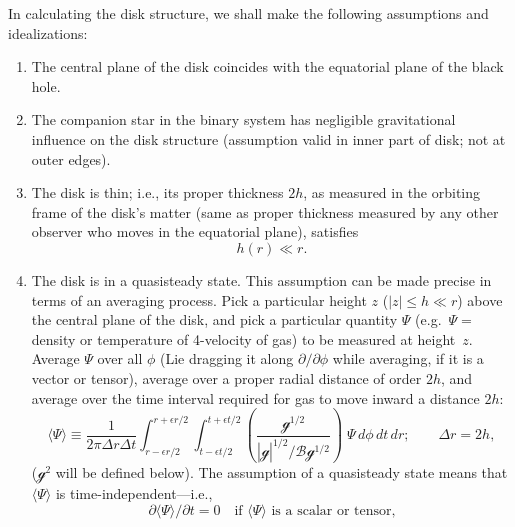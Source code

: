 

In calculating the disk structure, we shall make the following assumptions
and idealizations:
\begin{enumerate}
\item[(i)] The central plane of the disk coincides with the equatorial plane of the
black hole.
\item[(ii)] The companion star in the binary system has negligible gravitational
influence on the disk structure (assumption valid in inner part of disk;
not at outer edges).
\item[(iii)] The disk is thin; i.e., its proper thickness $2h$, as measured in the orbiting
frame of the disk's matter (same as proper thickness measured by any
other observer who moves in the equatorial plane), satisfies
\begin{equation}
h(r) \ll r. \tag{5.5.1}
\end{equation}
\item[(iv)] The disk is in a quasisteady state. This assumption can be made precise
in terms of an averaging process. Pick a particular height $z$ ($|z| \leq h \ll r$)
above the central plane of the disk, and pick a particular quantity $\Psi$
(e.g.\ $\Psi = {}$density or temperature of 4-velocity of gas) to be measured at
height~$z$. Average $\Psi$ over all $\phi$ (Lie dragging it along $\partial/\partial\phi$ while averaging,
if it is a vector or tensor), average over a proper radial distance of order
$2h$, and average over the time interval required for gas to move inward
a distance $2h$:
\begin{equation}
\langle \Psi \rangle \equiv \frac{1}{2\pi \Delta r \Delta t}
\int_{r-\epsilon r/2}^{r+\epsilon r/2}\int_{t-\epsilon t/2}^{t+\epsilon t/2}
\left(\frac{\mathscr{g}^{1/2}}{|\mathscr{g}\!|^{1/2}/\mathscr{B}\mathscr{g}^{1/2}}\right)
\;\Psi\, d\phi\, dt\, dr; \qquad \Delta r = 2h,
\tag{5.5.2}
\end{equation}
($\mathscr{g}^2$ will be defined below).  The assumption of a quasisteady state means
that $\langle \Psi \rangle$ is time-independent---i.e.,
\begin{equation}
\partial \langle \Psi \rangle / \partial t = 0 \quad \text{if } \langle \Psi \rangle \text{ is a scalar or tensor,}

\end{equation}
\end{enumerate}

